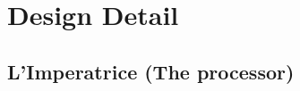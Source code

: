 \chapter{Design Detail} %
\label{cha:system_design}




\section{L'Imperatrice (The processor)} %
\label{sec:l_imperatrice}




